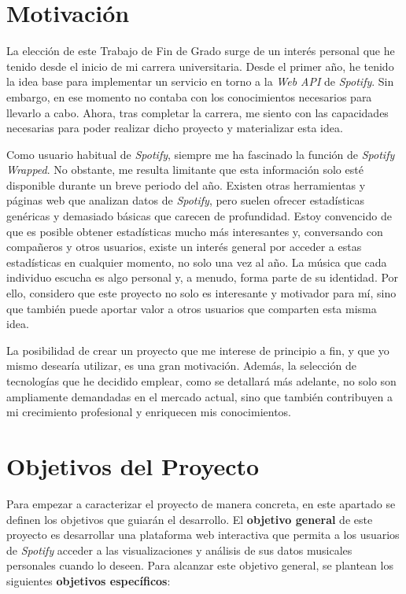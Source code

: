 \section{Motivación}

La elección de este Trabajo de Fin de Grado surge de un interés personal que he tenido desde el inicio de mi carrera universitaria. Desde el primer año, he tenido la idea base para implementar un servicio en torno a la \textit{Web API} de \textit{Spotify}. Sin embargo, en ese momento no contaba con los conocimientos necesarios para llevarlo a cabo. Ahora, tras completar la carrera, me siento con las capacidades necesarias para poder realizar dicho proyecto y materializar esta idea.

Como usuario habitual de \textit{Spotify}, siempre me ha fascinado la función de \textit{Spotify Wrapped}. No obstante, me resulta limitante que esta información solo esté disponible durante un breve periodo del año. Existen otras herramientas y páginas web que analizan datos de \textit{Spotify}, pero suelen ofrecer estadísticas genéricas y demasiado básicas que carecen de profundidad. Estoy convencido de que es posible obtener estadísticas mucho más interesantes y, conversando con compañeros y otros usuarios, existe un interés general por acceder a estas estadísticas en cualquier momento, no solo una vez al año. La música que cada individuo escucha es algo personal y, a menudo, forma parte de su identidad. Por ello, considero que este proyecto no solo es interesante y motivador para mí, sino que también puede aportar valor a otros usuarios que comparten esta misma idea.

La posibilidad de crear un proyecto que me interese de principio a fin, y que yo mismo desearía utilizar, es una gran motivación. Además, la selección de tecnologías que he decidido emplear, como se detallará más adelante, no solo son ampliamente demandadas en el mercado actual, sino que también contribuyen a mi crecimiento profesional y enriquecen mis conocimientos.

\section{Objetivos del Proyecto}

Para empezar a caracterizar el proyecto de manera concreta, en este apartado se definen los objetivos que guiarán el desarrollo. El \textbf{objetivo general} de este proyecto es desarrollar una plataforma web interactiva que permita a los usuarios de \textit{Spotify} acceder a las visualizaciones y análisis de sus datos musicales personales cuando lo deseen. Para alcanzar este objetivo general, se plantean los siguientes \textbf{objetivos específicos}:

